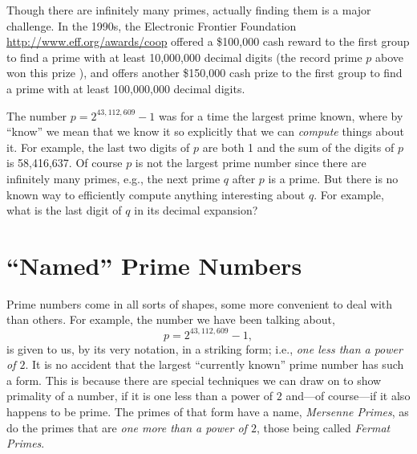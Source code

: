 \documentclass[openany]{book}
\theoremstyle{plain}
\theoremstyle{definition}
\begin{document}
Though there are infinitely many primes, actually finding them is a
major challenge.  In the 1990s, the Electronic Frontier Foundation
\url{http://www.eff.org/awards/coop} offered a \$100,000 cash reward
to the first group to find a prime with at least 10,000,000 decimal
digits (the record prime $p$ above won this prize ), and offers
another \$150,000 cash prize to the first group to find a prime with
at least 100,000,000 decimal digits.


The number $p= 2^{43,112,609} - 1$  was for a time
the largest prime known, where by
``know'' we mean that we know it so explicitly that we can {\em
  compute} things about it.  For example, the last two digits of $p$
are both 1 and the sum of the digits of $p$ is 58,416,637.\label{sumdigits}  Of course $p$ is not
the largest prime number since there are infinitely many primes, e.g.,
the next prime $q$ after $p$ is a prime.  But there is no known way
to efficiently compute anything interesting about $q$.  For example,
what is the last digit of $q$ in its decimal expansion?


\chapter{``Named'' Prime Numbers}
Prime numbers come in all sorts of shapes, some more convenient to
deal with than others.  For example, the number we have been talking
about, $$p = 2^{43,112,609}-1,$$ is given to us, by its very notation,
in a striking form; i.e., {\it one less than a power of $2$}. It is no
accident that the largest ``currently known'' prime number has such a
form.  This is because there are special techniques we can draw on to
show primality of a number, if it is one less than a power of $2$
and---of course---if it also happens to be prime.  The primes of that
form have a name, {\it Mersenne Primes}, as do the primes that are
{\it one more than a power of $2$}, those being called {\it Fermat
  Primes}.
\end{document}
